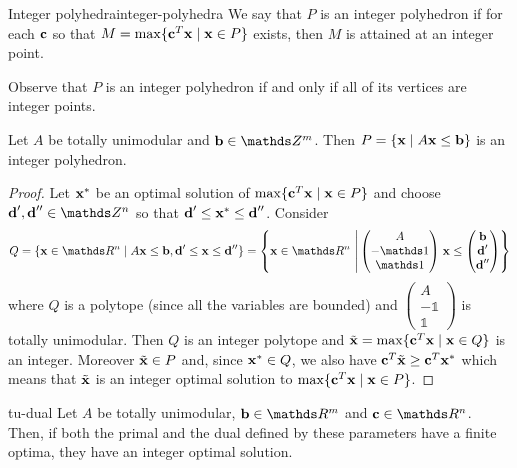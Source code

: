 \documentclass[12pt]{extarticle}
\renewcommand{\vec}[1]{\bvec{#1}}
\begin{document}
\begin{definition}{Integer polyhedra}{integer-polyhedra}
	We say that $P$ is an integer polyhedron if for each $\vec c$ so that
	$M = \max\{\vec c^T \vec x \mid \vec x \in P\}$ exists, then $M$ is attained at an integer point.
\end{definition}

Observe that $P$ is an integer polyhedron if and only if all of its vertices are integer points.

\begin{corollary}{}{}
	Let $A$ be totally unimodular and $\vec b \in \Z^m$. Then
	$P = \{ \vec x \mid A \vec x \leq \vec b \}$ is an integer polyhedron.
\end{corollary}

\begin{proof}
	Let $\vec x^*$ be an optimal solution of $\max \{ \vec c^T \vec x \mid \vec x \in P \}$ and choose
	$\vec d', \vec d'' \in \Z^n$ so that $\vec d' \leq \vec x^* \leq \vec d''$.
	Consider
	\begin{equation}
		Q = \{ \vec x \in \R^n \mid A \vec x \leq \vec b, \vec d' \leq \vec x \leq \vec d''\}
		= \left\{ \vec x \in \R^n \, \left| \, \begin{pmatrix} A \\ - \mathds 1 \\ \mathds 1
		\end{pmatrix} \right.
		\vec x \leq \begin{pmatrix} \vec b \\ \vec d' \\ \vec d''\end{pmatrix} \right\}
	\end{equation}
	where $Q$ is a polytope (since all the variables are bounded) and
	$\begin{pmatrix} A \\ - \mathds 1 \\ \mathds 1 \end{pmatrix}$ is totally unimodular.
	Then $Q$ is an integer polytope and $\tilde{\vec x} = \max \{\vec c^T \vec x \mid \vec x \in Q\}$
	is an integer.
	Moreover $\tilde{\vec x} \in P$ and, since $\vec x^* \in Q$, we also have
	$\vec c^T \tilde{\vec x} \geq \vec c^T \vec x^*$ which means that $\tilde{\vec x}$ is an integer
	optimal solution to $\max \{\vec c^T \vec x \mid \vec x \in P \}$.
\end{proof}

\begin{corollary}{}{tu-dual}
	Let $A$ be totally unimodular, $\vec b \in \R^m$ and $\vec c \in \R^n$. Then, if both the primal
	and the dual defined by these parameters have a finite optima, they have an integer optimal
	solution.
\end{corollary}
\end{document}

